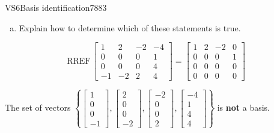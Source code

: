 \begin{exercise}{VS6}{Basis identification}{7883}
\begin{exerciseStatement}
\begin{enumerate}[(a)]
\begin{itemize}
 
\end{itemize}

     
\item  

 Explain how to determine which of these statements is true. 

 
\end{enumerate}

     \end{exerciseStatement}
 \begin{exerciseAnswer} 

 \[
\mathrm{RREF}\, \left[\begin{array}{cccc}
1 & 2 & -2 & -4 \\
0 & 0 & 0 & 1 \\
0 & 0 & 0 & 4 \\
-1 & -2 & 2 & 4
\end{array}\right] = \left[\begin{array}{cccc}
1 & 2 & -2 & 0 \\
0 & 0 & 0 & 1 \\
0 & 0 & 0 & 0 \\
0 & 0 & 0 & 0
\end{array}\right]
            \] 

 

 The set of vectors \(\left\{ \left[\begin{array}{c}
1 \\
0 \\
0 \\
-1
\end{array}\right] , \left[\begin{array}{c}
2 \\
0 \\
0 \\
-2
\end{array}\right] , \left[\begin{array}{c}
-2 \\
0 \\
0 \\
2
\end{array}\right] , \left[\begin{array}{c}
-4 \\
1 \\
4 \\
4
\end{array}\right] \right\}\) is \textbf{not} a basis. 

 \end{exerciseAnswer}
 \end{exercise}


